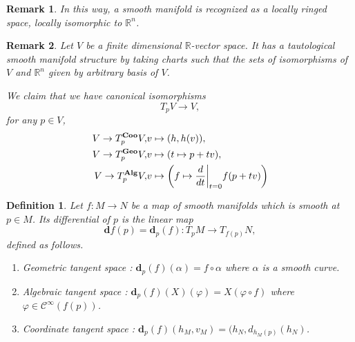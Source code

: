 \documentclass{article}
\newtheorem{definition}{Definition}[section]
\newtheorem{remark}{Remark}[section]
\numberwithin{equation}{section}
\begin{document}
\begin{remark}
In this way, a smooth manifold is recognized as a locally ringed space, locally isomorphic to $\mathbb{R}^n$.
\end{remark}

\begin{remark}
Let $V$ be a finite dimensional $\mathbb{R}$-vector space. It has a tautological smooth manifold structure by taking charts such 
that the sets of isomorphisms of $V$ and $\mathbb{R}^n$ given by arbitrary basis of $V$. \\
\par We claim that we have canonical isomorphisms
\begin{equation*}
T_pV\to V,
\end{equation*}
for any $p\in V$,
\begin{align*}
V\to T_p^{\mathbf{Coo}}V,& v\mapsto(h,h(v)),\\
V\to T_p^{\mathbf{Geo}}V,& v\mapsto(t\mapsto p+tv),\\
V\to T_p^{\mathbf{Alg}}V,& v\mapsto\left(f\mapsto{\frac d {dt}}\bigg{|}_{t=0}f(p+tv)\right)
\end{align*}
\end{remark}

\begin{definition}
Let $f:M\to N$ be a map of smooth manifolds which is smooth at $p\in M$. Its differential of $p$ is the linear map
\begin{equation*}
\mathbf{d}f(p) = \mathbf{d}_p(f):T_pM\to T_{f(p)}N,
\end{equation*}
defined as follows.
\begin{enumerate}[1).]
\item Geometric tangent space : $\mathbf{d}_p(f)(\alpha) = f\circ\alpha$ where $\alpha$ is a smooth curve.
\item Algebraic tangent space : $\mathbf{d}_p(f)(X)(\varphi) = X(\varphi\circ f)$ where $\varphi\in\mathcal{C}^\infty(f(p))$.
\item Coordinate tangent space : $\mathbf{d}_p(f)(h_M,v_M) = (h_N,d_{h_M(p)}(h_N)$.
\end{enumerate}
\end{definition}
\end{document}
